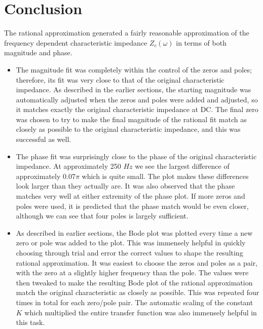 \documentclass[10pt, oneside, letterpaper]{article}
\begin{document}
\newpage
\section{Conclusion}
The rational approximation generated a fairly reasonable approximation of the frequency dependent characteristic impedance $Z_c(\omega{})$ in terms of both magnitude and phase.
\begin{itemize}
    \item The magnitude fit was completely within the control of the zeros and poles; therefore, its fit was very close to that of the original characteristic impedance. As described in the earlier sections, the starting magnitude was automatically adjusted when the zeros and poles were added and adjusted, so it matches exactly the original characteristic impedance at DC. The final zero was chosen to try to make the final magnitude of the rational fit match as closely as possible to the original characteristic impedance, and this was successful as well.
    \item The phase fit was surprisingly close to the phase of the original characteristic impedance. At approximately 250 $Hz$ we see the largest difference of approximately 0.07$\pi$ which is quite small. The plot makes these differences look larger than they actually are. It was also observed that the phase matches very well at either extremity of the phase plot. If more zeros and poles were used, it is predicted that the phase match would be even closer, although we can see that four poles is largely sufficient.
    \item As described in earlier sections, the Bode plot was plotted every time a new zero or pole was added to the plot. This was immensely helpful in quickly choosing through trial and error the correct values to shape the resulting rational approximation. It was easiest to choose the zeros and poles as a pair, with the zero at a slightly higher frequency than the pole. The values were then tweaked to make the resulting Bode plot of the rational approximation match the original characteristic as closely as possible. This was repeated four times in total for each zero/pole pair. The automatic scaling of the constant $K$ which multiplied the entire transfer function was also immensely helpful in this task.

\end{itemize}
\end{document}
